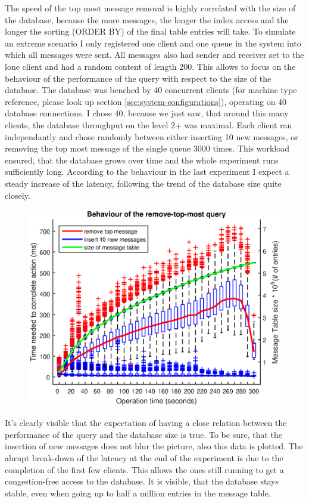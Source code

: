 \documentclass[11pt]{article}
\begin{document}
The speed of the top most message removal is highly correlated with the size of the database, because the more messages, the longer the index access and the longer the sorting (ORDER BY) of the final table entries will take. To simulate an extreme scenario I only registered one client and one queue in the system into which all messages were sent. All messages also had sender and receiver set to the lone client and had a random content of length 200. This allows to focus on the behaviour of the performance of the query with respect to the size of the database. The database was benched by 40 concurrent clients (for machine type reference, please look up section \ref{sec:system-configurations}), operating on 40 database connections. I chose 40, because we just saw, that around this many clients, the database throughput on the level 2+ was maximal. Each client ran independantly and chose randomly between either inserting 10 new messages, or removing the top most message of the single queue 3000 times. This workload ensured, that the database grows over time and the whole experiment runs sufficiently long. According to the behaviour in the last experiment I expect a steady increase of the latency, following the trend of the database size quite closely.
\begin{figure}[!htb]
\centering
\includegraphics[width=0.7\linewidth]{figures/database/data_baseline}
\caption*{}
\label{fig:data_baseline}
\end{figure}
It's clearly visible that the expectation of having a close relation between the performance of the query and the database size is true. To be sure, that the insertion of new messages does not blur the picture, also this data is plotted. The abrupt break-down of the latency at the end of the experiment is due to the completion of the first few clients. This allows the ones still running to get a congestion-free access to the database. It is visible, that the database stays stable, even when going up to half a million entries in the message table.
\end{document}
